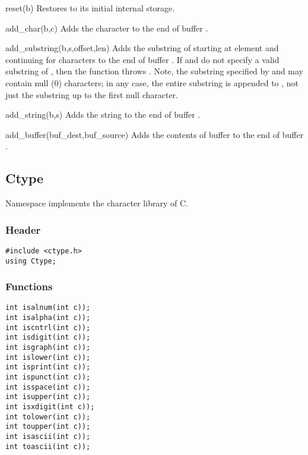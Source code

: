 \begin{defun}{reset}{(b)}
Restores  to its initial internal storage.
\end{defun}

\begin{defun}{add_char}{(b,c)}
Adds the character  to the end of buffer .
\end{defun}

\begin{defun}{add_substring}{(b,s,offset,len)}
Adds the substring of  starting at element  and
continuing for  characters to the end of buffer .  If
 and  do not specify a valid substring of ,
then the function throws .
Note, the substring specified by  and  may contain
null (0) characters; in any case, the entire substring is appended to
, not just the substring up to the first null character.
\end{defun}

\begin{defun}{add_string}{(b,s)}
Adds the string  to the end of buffer .
\end{defun}

\begin{defun}{add_buffer}{(buf_dest,buf_source)}
Adds the contents of buffer  to the end of buffer
.
\end{defun}

\subsection{Ctype}

Namespace  implements the character library of C\@.

\subsubsection*{Header}
\begin{verbatim}
#include <ctype.h>
using Ctype;
\end{verbatim}

\subsubsection*{Functions}
\begin{verbatim}
int isalnum(int c));
int isalpha(int c));
int iscntrl(int c));
int isdigit(int c));
int isgraph(int c));
int islower(int c));
int isprint(int c));
int ispunct(int c));
int isspace(int c));
int isupper(int c));
int isxdigit(int c));
int tolower(int c));
int toupper(int c));
int isascii(int c));
int toascii(int c));
\end{verbatim}

